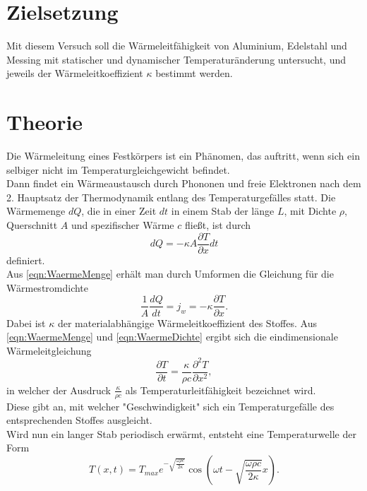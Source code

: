 \section{Zielsetzung}
\label{sec:Zielsetzung}
Mit diesem Versuch soll die Wärmeleitfähigkeit von Aluminium, Edelstahl und Messing
mit statischer und dynamischer Temperaturänderung untersucht, und jeweils der Wärmeleitkoeffizient $\kappa$ bestimmt werden.
\section{Theorie}
\label{sec:Theorie}
Die Wärmeleitung eines Festkörpers ist ein Phänomen, das auftritt, wenn sich ein selbiger nicht im Temperaturgleichgewicht
befindet. \\
Dann findet ein Wärmeaustausch durch Phononen und freie Elektronen nach dem 2. Hauptsatz der Thermodynamik entlang des Temperaturgefälles statt.
Die Wärmemenge $dQ$, die in einer Zeit $dt$ in einem Stab der länge $L$, mit Dichte $\rho$, Querschnitt $A$ und spezifischer Wärme $c$ fließt, ist durch
\begin{equation}
    \label{eqn:WaermeMenge}
    dQ = -\kappa A\frac{\partial T}{\partial x}dt
\end{equation}
definiert.\\
Aus \eqref{eqn:WaermeMenge} erhält man durch Umformen die Gleichung für die Wärmestromdichte
\begin{equation}
    \label{eqn:WaermeDichte}
    \frac{1}{A}\frac{dQ}{dt} = j_w = -\kappa \frac{\partial T}{\partial x}.
\end{equation}
Dabei ist $\kappa$ der materialabhängige Wärmeleitkoeffizient des Stoffes.
Aus \eqref{eqn:WaermeMenge} und \eqref{eqn:WaermeDichte} ergibt sich die eindimensionale Wärmeleitgleichung
\begin{equation}
    \frac{\partial T}{\partial t} = \frac{\kappa}{\rho c}\frac{\partial^2 T}{\partial x^2},
\end{equation}
in welcher der Ausdruck $\frac{\kappa}{\rho c}$ als Temperaturleitfähigkeit bezeichnet wird. \\
Diese gibt an, mit welcher "Geschwindigkeit" sich ein Temperaturgefälle des entsprechenden Stoffes ausgleicht.
\\
Wird nun ein langer Stab periodisch erwärmt, entsteht eine Temperaturwelle der Form
\begin{equation}
    T\left(x,t\right) = T_{max}e^{-\sqrt{\frac{\omega \rho c}{2\kappa}}}\cos\left(\omega t - \sqrt{\frac{\omega \rho c}{2\kappa}}x\right).
\end{equation}
